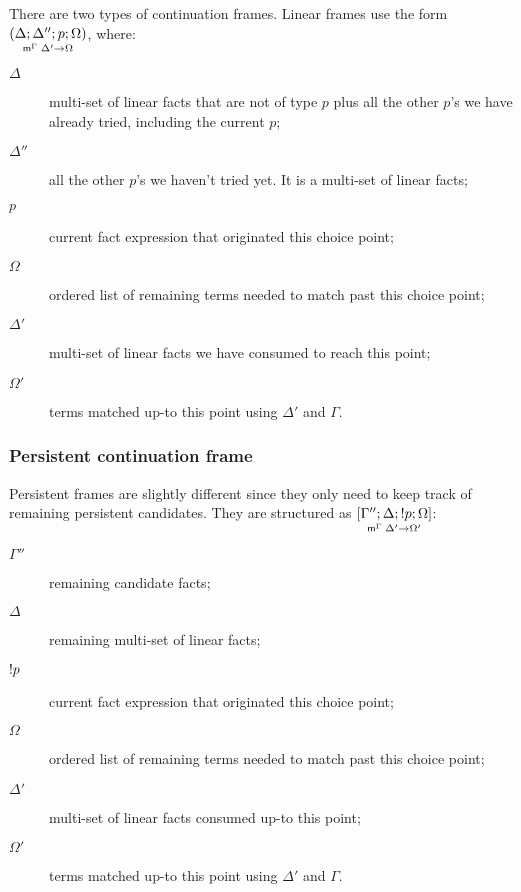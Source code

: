 There are two types of continuation frames. Linear frames use the form
$\lframe{\Delta}{\Delta''}{p}{\Omega}{\Delta'}{\Omega}$, where:

\begin{description}
   \item[$\Delta$] multi-set of linear facts that are not of type $p$ plus all
   the other $p$'s we have already tried, including the current $p$;

   \item[$\Delta''$] all the other $p$'s we haven't tried yet. It is a multi-set
   of linear facts;

   \item[$p$] current fact expression that originated this choice point;

   \item[$\Omega$] ordered list of remaining terms needed to match past this
   choice point;

   \item[$\Delta'$] multi-set of linear facts we have consumed to reach this point;

   \item[$\Omega'$] terms matched up-to this point using $\Delta'$ and $\Gamma$.
\end{description}

\subsubsection{Persistent continuation frame}

Persistent frames are slightly different since they only need to keep track of
remaining persistent candidates. They are structured as $\pframe{\Gamma''}{\Delta}{\bang
   p}{\Omega}{\Delta'}{\Omega'}$:

\begin{description}
   \item[$\Gamma''$] remaining candidate facts;
   \item[$\Delta$] remaining multi-set of linear facts;
   \item[$\bang p$] current fact expression that originated this choice point;
   \item[$\Omega$] ordered list of remaining terms needed to match past this
   choice point;
   \item[$\Delta'$] multi-set of linear facts consumed up-to this point;
   \item[$\Omega'$] terms matched up-to this point using $\Delta'$ and $\Gamma$.
\end{description}


